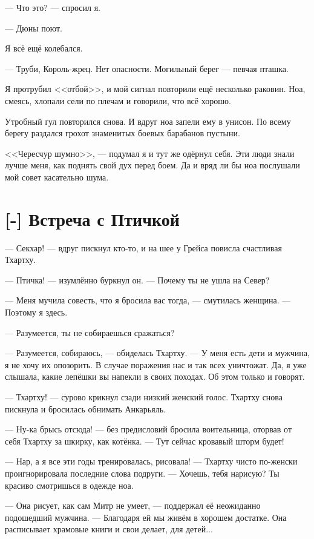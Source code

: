 --- Что это? --- спросил я.

--- Дюны поют.

Я всё ещё колебался.

--- Труби, Король-жрец.
Нет опасности.
Могильный берег --- певчая пташка.

Я протрубил <<отбой>>, и мой сигнал повторили ещё несколько раковин.
Ноа, смеясь, хлопали сели по плечам и говорили, что всё хорошо.

Утробный гул повторился снова.
И вдруг ноа запели ему в унисон.
По всему берегу раздался грохот знаменитых боевых барабанов пустыни.

<<Чересчур шумно>>, --- подумал я и тут же одёрнул себя.
Эти люди знали лучше меня, как поднять свой дух перед боем.
Да и вряд ли бы ноа послушали мой совет касательно шума.

\section{[-] Встреча с Птичкой}

\textspace

--- Секхар! --- вдруг пискнул кто-то, и на шее у Грейса повисла счастливая Тхартху.

--- Птичка! --- изумлённо буркнул он.
--- Почему ты не ушла на Север?

--- Меня мучила совесть, что я бросила вас тогда, --- смутилась женщина.
--- Поэтому я здесь.

--- Разумеется, ты не собираешься сражаться?

--- Разумеется, собираюсь, --- обиделась Тхартху.
--- У меня есть дети и мужчина, я не хочу их опозорить.
В случае поражения нас и так всех уничтожат.
Да, я уже слышала, какие лепёшки вы напекли в своих походах.
Об этом только и говорят.

--- Тхартху! --- сурово крикнул сзади низкий женский голос.
Тхартху снова пискнула и бросилась обнимать Анкарьяль.

--- Ну-ка брысь отсюда! --- без предисловий бросила воительница, оторвав от себя Тхартху за шкирку, как котёнка.
--- Тут сейчас кровавый шторм будет!

--- Нар, а я все эти годы тренировалась, рисовала! --- Тхартху чисто по-женски проигнорировала последние слова подруги.
--- Хочешь, тебя нарисую?
Ты красиво смотришься в одежде ноа.

--- Она рисует, как сам Митр не умеет, --- поддержал её неожиданно подошедший мужчина.
--- Благодаря ей мы живём в хорошем достатке.
Она расписывает храмовые книги и свои делает, для детей...

